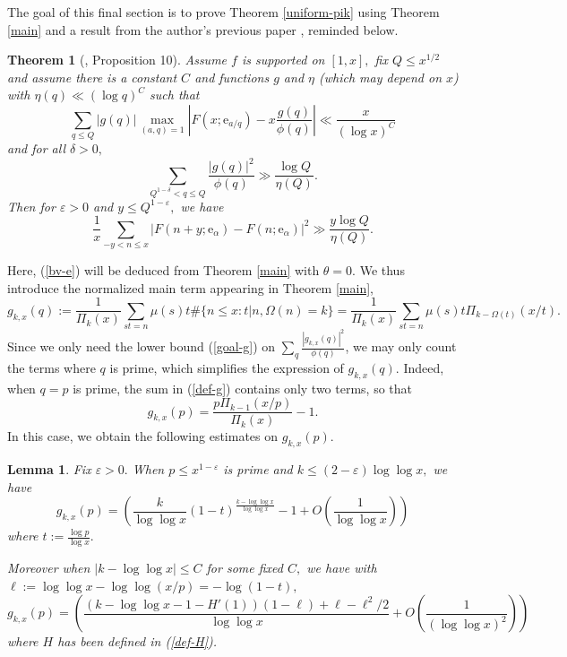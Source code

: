 \documentclass{article}
\newtheorem{theorem}[prop]{Theorem}
\newtheorem{lemma}[prop]{Lemma}
\newcommand{\e}{\mathrm{e}}
\newcommand{\eps}{\varepsilon}
\begin{document}
The goal of this final section is to prove Theorem \ref{uniform-pik} using Theorem \ref{main} and a result from the author's previous paper \cite{self}, reminded below.

\begin{theorem}[\cite{self}, Proposition 10]\label{y-le-q}
    Assume $f$ is supported on $[1,x],$ fix $Q \le x^{1/2}$ and assume there is a constant $C$ and functions $g$ and $\eta$ (which may depend on $x$) with $\eta(q) \ll (\log q)^C$ such that 
    \begin{equation}\label{bv-e}
        \sum_{q\le Q} |g(q)| \max_{(a,q) = 1} \left|F(x; \e_{a/q}) - x\frac{g(q)}{\phi(q)} \right| \ll \frac{x}{(\log x)^{C}}
    \end{equation} and for all $\delta > 0,$
    \begin{equation}\label{goal-g}
        \sum_{Q^{1-\delta}< q \le Q} \frac{|g(q)|^2}{\phi(q)} \gg \frac{\log Q}{\eta(Q)}.
    \end{equation}
    Then for $\eps > 0$ and $y \le Q^{1-\eps},$ we have $$\frac{1}{x}\sum_{-y< n\le x} \big|F(n+y;\e_\alpha) - F(n;\e_\alpha)\big|^2 \gg \frac{y\log Q}{\eta(Q)}.$$
\end{theorem}

Here, (\ref{bv-e}) will be deduced from Theorem \ref{main} with $\theta = 0.$ We thus introduce the normalized main term appearing in Theorem \ref{main},
\begin{equation}\label{def-g}
    g_{k,x}(q) := \frac{1}{\Pi_k(x)} \sum_{st = n} \mu(s)t \#\{n \le x : t|n, \Omega(n) = k\} = \frac{1}{\Pi_k(x)} \sum_{st = n} \mu(s)t \Pi_{k-\Omega(t)}(x/t).
\end{equation}
Since we only need the lower bound (\ref{goal-g}) on $\sum_q {\frac{|g_{k,x}(q)|^2}{\phi(q)}}$, we may only count the terms where $q$ is prime, which simplifies the expression of $g_{k,x}(q).$ Indeed, when $q=p$ is prime, the sum in (\ref{def-g}) contains only two terms, so that \begin{equation}
        g_{k,x}(p) = \frac{p\Pi_{k-1}(x/p)}{\Pi_k(x)} - 1 \label{q-prime}.
    \end{equation}
In this case, we obtain the following estimates on $g_{k,x}(p).$

\begin{lemma}\label{estim-pik}
    Fix $\eps > 0.$ When $p \le x^{1-\eps}$ is prime and $k \le (2-\eps) \log\log x,$ we have \begin{equation}\label{g-far}
        g_{k,x}(p) = \left( \frac{k}{\log\log x}(1-t)^{\frac{k-\log\log x}{\log\log x}} - 1 + O\left(\frac{1}{\log\log x}\right)\right)
    \end{equation} where $t := \frac{\log p}{\log x}.$

    Moreover when $|k-\log\log x| \le C$ for some fixed $C,$ we have with $\ell := \log\log x - \log\log (x/p) = -\log(1-t),$
    \begin{equation}\label{g-near}
        g_{k,x}(p) = \left(\frac{(k-\log\log x - 1 - H'(1))(1-\ell) + \ell - \ell^2/2}{\log\log x} + O\left(\frac{1}{(\log\log x)^2}\right) \right)
    \end{equation}
    where $H$ has been defined in (\ref{def-H}).
\end{lemma}
\end{document}
